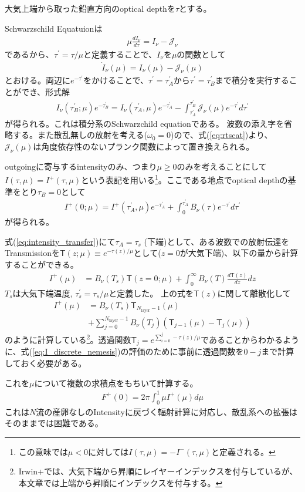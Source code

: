 大気上端から取った鉛直方向のoptical depthを$\tau$とする。

Schwarzschild Equatuionは
\begin{align}
    \mu \frac{d I_\nu}{d \tau} = I_\nu - \mathcal{J}_\nu    
\end{align}
であるから、$\tau^\prime = \tau/\mu$と定義することで、$I_\nu$を$\mu$の関数として
\begin{align}
    \dot{I}_\nu(\mu) =  I_\nu (\mu) - \mathcal{J}_\nu (\mu)
\end{align}
とおける。両辺に$e^{-\tau^\prime}$をかけることで、$\tau^\prime = \tau_A^\prime $から$\tau^\prime = \tau_B^\prime$まで積分を実行することができ、形式解
\begin{align}
     I_\nu (\tau_B^\prime; \mu) e^{-\tau_B^\prime} = I_\nu (\tau_A^\prime, \mu) e^{-\tau_A^\prime} - \int_{\tau_A^\prime}^{\tau_B^\prime} \mathcal{J}_\nu (\mu)  e^{-\tau^\prime} d \tau^\prime
\end{align}
が得られる。これは積分系のSchwarzchild equationである。
波数の添え字を省略する。また散乱無しの放射を考える($\omega_0=0$)ので、式(\ref{eq:rtscat})より、$\mathcal{J}_\nu (\mu)$は角度依存性のないプランク関数によって置き換えられる。


outgoingに寄与するintensityのみ、つまり$\mu \ge 0$のみを考えることにして$I(\tau, \mu)=I^+(\tau, \mu)$という表記を用いる\footnote{この意味では$\mu < 0$に対しては$I(\tau, \mu)=-I^-(\tau, \mu)$と定義される。}。ここである地点でoptical depthの基準をとり$\tau_B=0$として
\begin{align}
\label{eq:intensity_transfer}
         I^+ (0; \mu) = I^+ (\tau_A^\prime, \mu) e^{-\tau_A^\prime} +\int^{\tau_A^\prime}_{0} B_\nu (\tau) e^{-\tau^\prime} d \tau^\prime
\end{align}
が得られる。

式(\ref{eq:intensity_transfer})にて$\tau_A=\tau_s$ (下端)として、ある波数での放射伝達をTransmissionを$\mathsf{T}(z; \mu) \equiv e^{-\tau(z)/\mu}$として($z=0$が大気下端)、以下の量から計算することができる。
\begin{align}
    I^+(\mu) &= B_\nu(T_s) \mathsf{T} (z=0; \mu) + \int_0^\infty B_\nu(T) \frac{d \mathsf{T} (z)}{dz} dz 
\end{align}
$T_s$は大気下端温度, $\tau_s^\prime = \tau_s/\mu$と定義した。
上の式を$\mathsf{T}(z)$に関して離散化して
\begin{align}
    \label{eq:I_discrete_nemesis}
    I^+(\mu) &= B_\nu(T_s) \mathsf{T}_{N_\mathrm{layer}-1}(\mu) \nonumber \\
    &+ \sum_{j=0}^{N_\mathrm{layer}-1} B_\nu(T_j) (\mathsf{T}_{j-1}(\mu)- \mathsf{T}_j(\mu))
\end{align}
のように計算している\footnote{Irwin+では、大気下端から昇順にレイヤーインデックスを付与しているが、本文章では上端から昇順にインデックスを付与する。}。透過関数$\mathsf{T}_j = e^{\sum_{i=0}^j -\tau(z)/\mu}$であることからわかるように、式(\ref{eq:I_discrete_nemesis})の評価のために事前に透過関数を$0-j$まで計算しておく必要がある。

これを$\mu$について複数の求積点をもちいて計算する。
\begin{align}
    F^+(0) = 2 \pi \int_0^1 \mu I^+(\mu)  d \mu
\end{align}
これは$N$流の産卵なしのIntensityに戻づく輻射計算に対応し、散乱系への拡張はそのままでは困難である。

